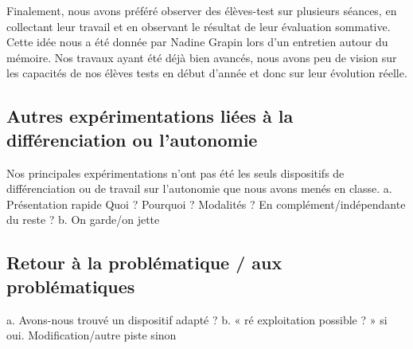 Finalement, nous avons préféré observer des élèves-test sur plusieurs séances, en collectant leur travail et en observant le résultat de leur évaluation sommative. Cette idée nous a été donnée par Nadine Grapin lors d'un entretien autour du mémoire. Nos travaux ayant été déjà bien avancés, nous avons peu de vision sur les capacités de nos élèves tests en début d'année et donc sur leur évolution réelle. 

\subsection{Autres expérimentations liées à la différenciation ou l’autonomie}
Nos principales expérimentations n'ont pas été les seuls dispositifs de différenciation ou de travail sur l'autonomie que nous avons menés en classe.
a.	Présentation rapide
Quoi ? Pourquoi ? Modalités ? En complément/indépendante du reste ?
b.	On garde/on jette
\subsection{Retour à la problématique / aux problématiques}
a.	Avons-nous trouvé un dispositif adapté ?
b.	« ré exploitation possible ? » si oui. Modification/autre piste sinon
